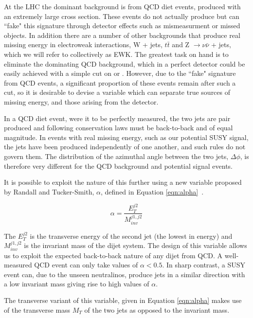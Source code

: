 At the LHC the dominant background is from QCD diet events, produced with an extremely large cross section. These events do not actually produce \met but can ``fake" this signature through detector effects such as mismeasurment or missed objects. In addition there are a number of other backgrounds that produce real missing energy in electroweak interactions, W + jets, $t \bar{t}$ and Z $\rightarrow \nu \bar{\nu}$ + jets, which we will refer to collectively as EWK. The greatest task on hand is to eliminate the dominating QCD background, which in a perfect detector could be easily achieved with a simple cut on \met or \mht. However, due to the ``fake" \met signature from QCD events, a significant proportion of these events remain after such a cut, so it is desirable to devise a variable which can separate true sources of missing energy, and those arising from the detector. 

In a QCD diet event, were it to be perfectly measured, the two jets are pair produced and following conservation laws must be back-to-back and of equal magnitude. In events with real missing energy, such as our potential SUSY signal, the jets have been produced independently of one another, and such rules do not govern them. The distribution of the azimuthal angle between the two jets, $\Delta \phi$, is therefore very different for the QCD background and potential signal events.  


It is possible to exploit the nature of this further using a new variable proposed by Randall and Tucker-Smith, $\alpha$, defined in Equation \ref{eqn:alpha}~\cite{Randall}. 

\begin{equation}
\alpha = \frac{E_{T}^{j2}}{M_{inv}^{j1,j2}}
\label{eqn:alpha}
\end{equation}

The $E_{T}^{j2}$ is the transverse energy of the second jet (the lowest in energy) and $M_{inv}^{j1,j2}$ is the invariant mass of the dijet system. The design of this variable allows us to exploit the expected back-to-back nature of any dijet from QCD. A well-measured QCD event can only take values of $\alpha < 0.5$. In sharp contrast, a SUSY event can, due to the unseen neutralinos, produce jets in a similar direction with a low invariant mass giving rise to high values of $\alpha$.

The transverse variant of this variable, given in Equation \ref{eqn:alpha} makes use of the transverse mass $M_{T}$ of the two jets as opposed to the invariant mass.

